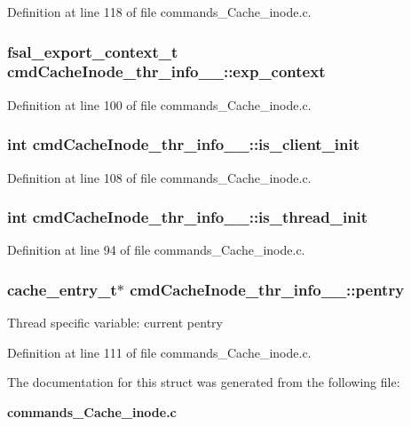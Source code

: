 Definition at line 118 of file commands\_\-Cache\_\-inode.c.
\subsubsection[{exp\_\-context}]{\setlength{\rightskip}{0pt plus 5cm}fsal\_\-export\_\-context\_\-t {\bf cmdCacheInode\_\-thr\_\-info\_\-\_\-::exp\_\-context}}\label{structcmdCacheInode__thr__info_____a0a20284e8253b99ee7e4b56461d9d9a2}


Definition at line 100 of file commands\_\-Cache\_\-inode.c.
\subsubsection[{is\_\-client\_\-init}]{\setlength{\rightskip}{0pt plus 5cm}int {\bf cmdCacheInode\_\-thr\_\-info\_\-\_\-::is\_\-client\_\-init}}\label{structcmdCacheInode__thr__info_____ab6c442d475291f04ccab5264bb9d1832}


Definition at line 108 of file commands\_\-Cache\_\-inode.c.
\subsubsection[{is\_\-thread\_\-init}]{\setlength{\rightskip}{0pt plus 5cm}int {\bf cmdCacheInode\_\-thr\_\-info\_\-\_\-::is\_\-thread\_\-init}}\label{structcmdCacheInode__thr__info_____ae3f101fe5aea33789f8944ab02b43b75}


Definition at line 94 of file commands\_\-Cache\_\-inode.c.
\subsubsection[{pentry}]{\setlength{\rightskip}{0pt plus 5cm}cache\_\-entry\_\-t$\ast$ {\bf cmdCacheInode\_\-thr\_\-info\_\-\_\-::pentry}}\label{structcmdCacheInode__thr__info_____ac8b1fcf5c464d1edf0750189f7f39218}
Thread specific variable: current pentry 

Definition at line 111 of file commands\_\-Cache\_\-inode.c.

The documentation for this struct was generated from the following file:\begin{DoxyCompactItemize}
\item 
{\bf commands\_\-Cache\_\-inode.c}\end{DoxyCompactItemize}

